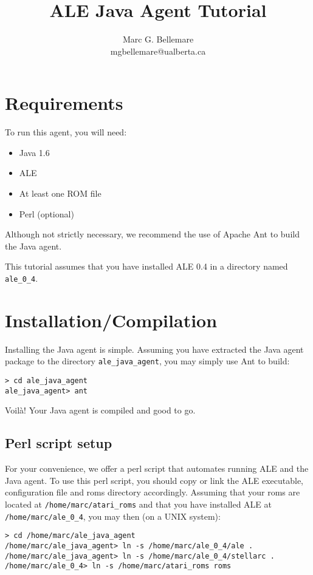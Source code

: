 \documentclass[12pt]{article}
\title{ALE Java Agent Tutorial}
\author{Marc G. Bellemare\\ mgbellemare@ualberta.ca}
\begin{document}
\maketitle

\section{Requirements}

To run this agent, you will need:

\begin{itemize}
  \item{Java 1.6}
  \item{ALE}
  \item{At least one ROM file}
  \item{Perl (optional)}
\end{itemize}

Although not strictly necessary, we recommend the use of Apache Ant to build
the Java agent.

This tutorial assumes that you have installed ALE 0.4 in a directory named
\verb+ale_0_4+.

\section{Installation/Compilation}

Installing the Java agent is simple. Assuming you have extracted the Java agent
package to the directory \verb+ale_java_agent+, you may simply use Ant to build:

\begin{verbatim}
> cd ale_java_agent
ale_java_agent> ant
\end{verbatim}

Voil\`a! Your Java agent is compiled and good to go.

\subsection{Perl script setup}\label{subsec:perl_script}
For your convenience, we offer a perl script that automates running ALE and
the Java agent. To use this perl script, you should copy or link the ALE 
executable, configuration file and roms directory accordingly. Assuming that
your roms are located at \verb+/home/marc/atari_roms+ and that you have 
installed ALE at \verb+/home/marc/ale_0_4+, you may then (on a UNIX system): 

\begin{verbatim}
> cd /home/marc/ale_java_agent
/home/marc/ale_java_agent> ln -s /home/marc/ale_0_4/ale . 
/home/marc/ale_java_agent> ln -s /home/marc/ale_0_4/stellarc . 
/home/marc/ale_0_4> ln -s /home/marc/atari_roms roms
\end{verbatim}
\end{document}
